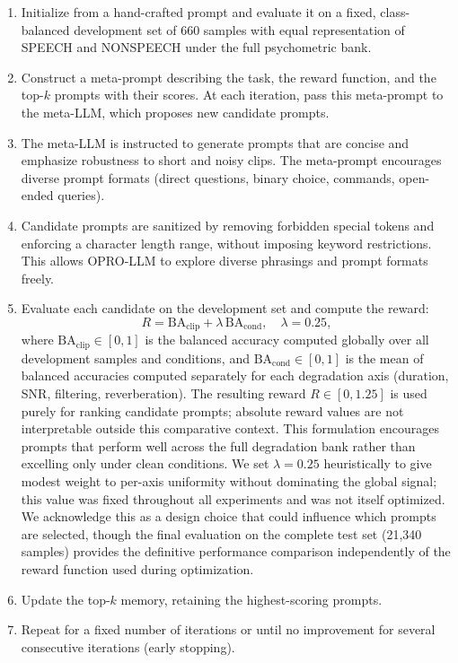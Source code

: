 \documentclass[11pt,a4paper]{article}
\begin{document}
\begin{enumerate}[leftmargin=*]
\item Initialize from a hand-crafted prompt and evaluate it on a fixed, class-balanced development set of 660 samples with equal representation of SPEECH and NONSPEECH under the full psychometric bank.

\item Construct a meta-prompt describing the task, the reward function, and the top-$k$ prompts with their scores. At each iteration, pass this meta-prompt to the meta-LLM, which proposes new candidate prompts.

\item The meta-LLM is instructed to generate prompts that are concise and emphasize robustness to short and noisy clips. The meta-prompt encourages diverse prompt formats (direct questions, binary choice, commands, open-ended queries).

\item Candidate prompts are sanitized by removing forbidden special tokens and enforcing a character length range, without imposing keyword restrictions. This allows OPRO-LLM to explore diverse phrasings and prompt formats freely.

\item Evaluate each candidate on the development set and compute the reward:
\begin{equation}
R = \mathrm{BA}_{\text{clip}} + \lambda \, \mathrm{BA}_{\text{cond}}, \quad \lambda = 0.25,
\end{equation}
where $\mathrm{BA}_{\text{clip}} \in [0,1]$ is the balanced accuracy computed globally over all development samples and conditions, and $\mathrm{BA}_{\text{cond}} \in [0,1]$ is the mean of balanced accuracies computed separately for each degradation axis (duration, SNR, filtering, reverberation). The resulting reward $R \in [0, 1.25]$ is used purely for ranking candidate prompts; absolute reward values are not interpretable outside this comparative context. This formulation encourages prompts that perform well across the full degradation bank rather than excelling only under clean conditions.
We set $\lambda = 0.25$ heuristically to give modest weight to per-axis uniformity without
dominating the global signal; this value was fixed throughout all experiments and was not
itself optimized. We acknowledge this as a design choice that could influence which prompts
are selected, though the final evaluation on the complete test set (21{,}340 samples) provides
the definitive performance comparison independently of the reward function used during
optimization.

\item Update the top-$k$ memory, retaining the highest-scoring prompts.

\item Repeat for a fixed number of iterations or until no improvement for several consecutive iterations (early stopping).
\end{enumerate}
\end{document}
